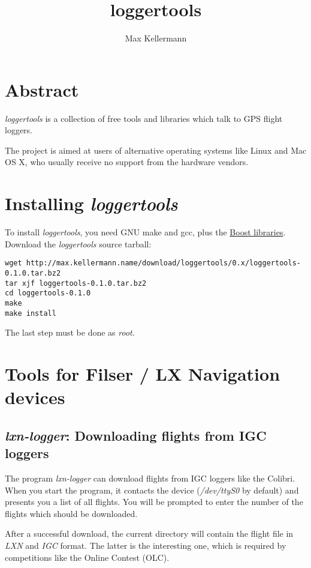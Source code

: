 \documentclass{article}
\title{loggertools}
\author{Max Kellermann}
\begin{document}
\maketitle
\tableofcontents


\section{Abstract}

{\em loggertools} is a collection of free tools and libraries which
talk to GPS flight loggers.

The project is aimed at users of alternative operating systems like
Linux and Mac OS X, who usually receive no support from the hardware
vendors.


\section{Installing {\em loggertools}}

To install {\em loggertools}, you need GNU make and gcc, plus the
\href{http://www.boost.org/}{Boost libraries}.  Download the {\em
loggertools} source tarball:

\begin{verbatim}
wget http://max.kellermann.name/download/loggertools/0.x/loggertools-0.1.0.tar.bz2
tar xjf loggertools-0.1.0.tar.bz2
cd loggertools-0.1.0
make
make install
\end{verbatim}

The last step must be done as {\em root}.


\section{Tools for Filser / LX Navigation devices}

\subsection{{\em lxn-logger}: Downloading flights from IGC loggers}

The program {\em lxn-logger} can download flights from IGC loggers
like the Colibri.  When you start the program, it contacts the device
({\em /dev/ttyS0} by default) and presents you a list of all flights.
You will be prompted to enter the number of the flights which should
be downloaded.

After a successful download, the current directory will contain the
flight file in {\em LXN} and {\em IGC} format.  The latter is the
interesting one, which is required by competitions like the Online
Contest (OLC).
\end{document}
